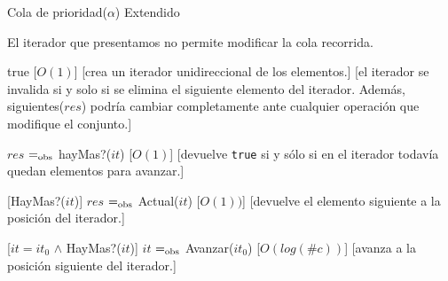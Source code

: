 \begin{Interfaz}
  \begin{tad}{Cola de prioridad($\alpha$) Extendido}
    \parskip=0pt
    
    \tadAxiomas
  \end{tad}


	El iterador que presentamos no permite modificar la cola recorrida.

	{true}
	[$O(1)$]
	[crea un iterador unidireccional de los elementos.]
	[el iterador se invalida si y solo si se elimina el siguiente elemento del iterador. Además, siguientes($res$) podría cambiar completamente ante cualquier operación que modifique el conjunto.]

	{$res$ $=_{\mathrm{obs}}$ hayMas?($it$)}
	[$O(1)$]
	[devuelve \texttt{true} si y sólo si en el iterador todavía quedan elementos para avanzar.]

	[HayMas?($it$)]
	{$res$ $=_{\mathrm{obs}}$ Actual($it$)}
	[$O(1))$]
	[devuelve el elemento siguiente a la posición del iterador.]

	[$it = it_0$ $\land$ HayMas?($it$)]
	{$it$ $=_{\mathrm{obs}}$ Avanzar($it_0$)}
	[$O(log(\#c))$]
	[avanza a la posición siguiente del iterador.]

\end{Interfaz}

